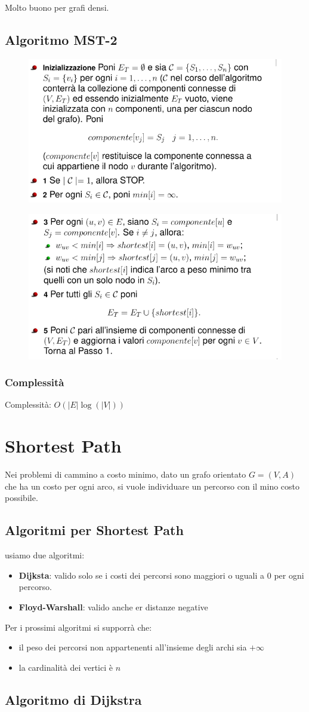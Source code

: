 Molto buono per grafi densi.

\subsection{Algoritmo MST-2}

\begin{figure}[H]
    \centering
    \includegraphics[width=0.6\linewidth]{img/Screenshot from 2022-06-01 11-25-45.png}
\end{figure}

\begin{figure}[H]
    \centering
    \includegraphics[width=0.6\linewidth]{img/Screenshot from 2022-06-01 11-26-45.png}
\end{figure}

\subsubsection{Complessità}
Complessità: $O(|E|\log(|V|))$


\section{Shortest Path}
Nei problemi di cammino a costo minimo, dato un grafo orientato $G=(V, A)$ che ha un costo per ogni arco,
si vuole individuare un percorso con il mino costo possibile.

\subsection{Algoritmi per Shortest Path}
usiamo due algoritmi:
\begin{itemize}
    \item \textbf{Dijksta}: valido solo se i costi dei percorsi sono maggiori o uguali a 0 per ogni percorso.
    \item \textbf{Floyd-Warshall}: valido anche er distanze negative
\end{itemize}


Per i prossimi algoritmi si supporrà che:
\begin{itemize}
    \item il peso dei percorsi non appartenenti all'insieme degli archi sia $+ \infty$
    \item la cardinalità dei vertici è $n$
\end{itemize}

\subsection{Algoritmo di Dijkstra}
